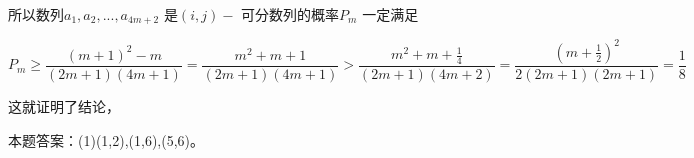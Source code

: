 \begin{question}
{所以数列$a_{1},a_{2},...,a_{4m+2}$ 是$(i,j)-$ 可分数列的概率$P_{m}$ 一定满足

$$P_{m}\geq\frac{\left(m+1\right)^{2}-m}{\left(2m+1\right)\left(4m+1\right)}=\frac{m^{2}+m+1}{\left(2m+1\right)\left(4m+1\right)}>\frac{m^{2}+m+\frac{1}{4}}{\left(2m+1\right)\left(4m+2\right)}=\frac{\left(m+\frac{1}{2}\right)^{2}}{2\left(2m+1\right)\left(2m+1\right)}=\frac{1}{8}$$

这就证明了结论，

本题答案：(1)(1,2),(1,6),(5,6)。
}
\end{question}